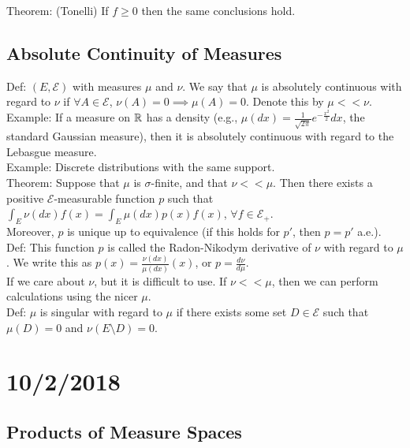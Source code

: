 \documentclass[english, 11pt]{article}
\begin{document}
Theorem: (Tonelli) If $f \geq 0$ then the same conclusions hold.

\subsection{Absolute Continuity of Measures}
Def: $(E, \mathcal{E})$ with measures $\mu$ and $\nu$. We say that $\mu$ is absolutely continuous with regard to $\nu$ if $\forall A \in \mathcal{E}$, $\nu(A) = 0 \implies \mu(A) = 0$. Denote this by $\mu << \nu$.\\

Example: If a measure on ${\mathbb{R}}$ has a density (e.g., $\mu(dx) = \frac{1}{\sqrt{2\pi}} e^{-\frac{x^2}{2}} dx$, the standard Gaussian measure), then it is absolutely continuous with regard to the Lebasgue measure.\\

Example: Discrete distributions with the same support.\\

Theorem: Suppose that $\mu$ is $\sigma$-finite, and that $\nu << \mu$. Then there exists a positive $\mathcal{E}$-measurable function $p$ such that $\int_E \nu(dx) f(x) = \int_E \mu(dx) p(x)f(x)$, $\forall f \in \mathcal{E}_+$.\\

Moreover, $p$ is unique up to equivalence (if this holds for $p'$, then $p = p'$ a.e.).\\

Def: This function $p$ is called the Radon-Nikodym derivative of $\nu$ with regard to $\mu$. We write this as $p(x) = \frac{\nu(dx)}{\mu(dx)}(x)$, or $p = \frac{d\nu}{d\mu}$.\\

If we care about $\nu$, but it is difficult to use. If $\nu << \mu$, then we can perform calculations using the nicer $\mu$.\\

Def: $\mu$ is singular with regard to $\mu$ if there exists some set $D \in \mathcal{E}$ such that $\mu(D) = 0$ and $\nu(E \setminus D) = 0$.

\section{10/2/2018}

\subsection{Products of Measure Spaces}
\end{document}
